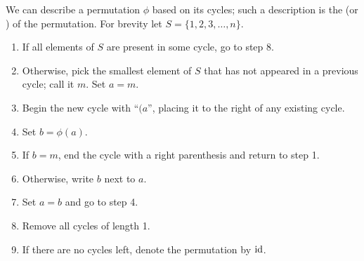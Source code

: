We can describe a permutation $\phi$ based on its cycles; such a description is the  (or ) of the permutation. For brevity let $S = \{1, 2, 3, \dots, n\}$.
\begin{enumerate}
    \item If all elements of $S$ are present in some cycle, go to step 8.
    \item Otherwise, pick the smallest element of $S$ that has not appeared in a previous cycle; call it $m$. Set $a = m$.
    \item Begin the new cycle with ``$(a$'', placing it to the right of any existing cycle.
    \item Set $b = \phi(a)$.
    \item If $b = m$, end the cycle with a right parenthesis and return to step 1.
    \item Otherwise, write $b$ next to $a$.
    \item Set $a = b$ and go to step 4.
    \item Remove all cycles of length 1.
    \item If there are no cycles left, denote the permutation by $\mathrm{id}$.
\end{enumerate}

\newpage

